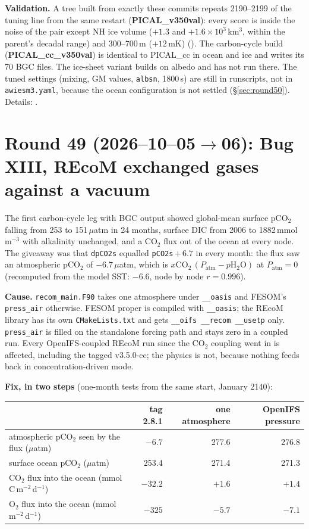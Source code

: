 \documentclass[10pt]{article}
\begin{document}
\textbf{Validation.} A tree built from exactly these commits repeats 2190--2199 of the tuning line
from the same restart (\textbf{PICAL\_v350val}): every score is inside the noise of the pair except
NH ice volume ($+1.3$ and $+1.6\times10^3$\,km$^3$, within the parent's decadal range) and
300--700\,m ($+12$\,mK) (). The carbon-cycle build
(\textbf{PICAL\_cc\_v350val}) is identical to PICAL\_cc in ocean and ice and writes its 70 BGC files.
The ice-sheet variant builds on albedo and has not run there. The tuned settings (mixing, GM values,
\texttt{albsn}, 1800\,s) are still in runscripts, not in \texttt{awiesm3.yaml}, because the ocean
configuration is not settled (\S\ref{sec:round50}). Details: .

\section{Round 49 (2026--10--05$\to$06): Bug XIII, REcoM exchanged gases against a vacuum}\label{sec:round49}

The first carbon-cycle leg with BGC output showed global-mean surface pCO$_2$ falling from 253 to
151\,$\mu$atm in 24 months, surface DIC from 2006 to 1882\,mmol\,m$^{-3}$ with alkalinity unchanged, and
a CO$_2$ flux out of the ocean at every node. The giveaway was that \texttt{dpCO2s} equalled
\texttt{pCO2s}\,$+\,6.7$ in every month: the flux saw an atmospheric pCO$_2$ of $-6.7\,\mu$atm, which is
$x\mathrm{CO_2}\,(P_\mathrm{atm}-p\mathrm{H_2O})$ at $P_\mathrm{atm}=0$ (recomputed from the model SST:
$-6.6$, node by node $r=0.996$).

\textbf{Cause.} \texttt{recom\_main.F90} takes one atmosphere under \texttt{\_\_oasis} and FESOM's
\texttt{press\_air} otherwise. FESOM proper is compiled with \texttt{\_\_oasis}; the REcoM library has
its own \texttt{CMakeLists.txt} and gets \texttt{\_\_oifs \_\_recom \_\_usetp} only. \texttt{press\_air}
is filled on the standalone forcing path and stays zero in a coupled run. Every OpenIFS-coupled REcoM
run since the CO$_2$ coupling went in is affected, including the tagged v3.5.0-cc; the physics is not,
because nothing feeds back in concentration-driven mode.

\textbf{Fix, in two steps} (one-month tests from the same start, January 2140):

\begin{center}\small
\begin{tabular}{lrrr}
\toprule
& tag 2.8.1 & one atmosphere & OpenIFS pressure \\
\midrule
atmospheric pCO$_2$ seen by the flux ($\mu$atm) & $-6.7$ & 277.6 & 276.8 \\
surface ocean pCO$_2$ ($\mu$atm) & 253.4 & 271.4 & 271.3 \\
CO$_2$ flux into the ocean (mmol\,C\,m$^{-2}$\,d$^{-1}$) & $-32.2$ & $+1.6$ & $+1.4$ \\
O$_2$ flux into the ocean (mmol\,m$^{-2}$\,d$^{-1}$) & $-325$ & $-5.7$ & $-7.1$ \\
\bottomrule
\end{tabular}
\end{center}
\end{document}

